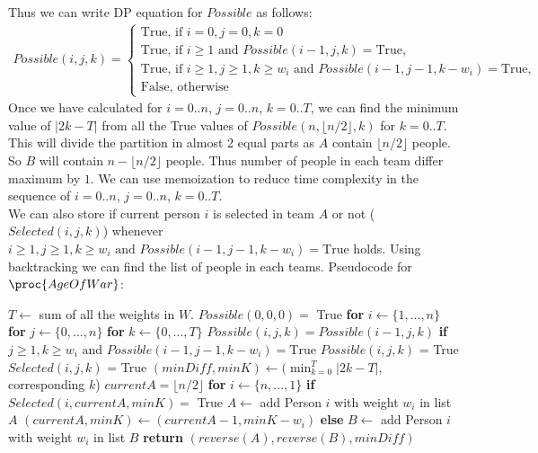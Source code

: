 \documentclass[11pt]{article}
\begin{document}
Thus we can write DP equation for $Possible$ as follows:
\begin{equation}\label{2_1}
    \begin{split}
       Possible(i,j,k) = 
       \begin{cases}
            \text{True, if } i=0,j=0,k=0\\
            \text{True, if } i\geq 1 \text{ and }Possible(i-1,j,k) = \text{True},\\
            \text{True, if } i \geq 1, j\geq1, k\geq w_i \text{ and }Possible(i-1,j-1,k-w_i) = \text{True},\\
            \text{False, otherwise}
        \end{cases}
    \end{split}
\end{equation}
Once we have calculated for $i={0..n}$, $j={0..n}$, $k={0..T}$, we can find the minimum value of $|2k-T|$ from all the True values of $Possible(n,\lfloor n/2 \rfloor,k)$ for $k={0..T}$. This will divide the partition in almost 2 equal parts as $A$ contain $\lfloor n/2 \rfloor$ people. So $B$ will contain $n-\lfloor n/2 \rfloor$ people. Thus number of people in each team differ maximum by $1$. We can use memoization to reduce time complexity in the sequence of $i={0..n}$, $j={0..n}$, $k={0..T}$.\\
We can also store if current person $i$ is selected in team $A$ or not ($Selected(i,j,k)$) whenever $i \geq 1, j\geq1, k\geq w_i \text{ and }Possible(i-1,j-1,k-w_i) = \text{True}$ holds. Using backtracking we can find the list of people in each teams.
\newpage
Pseudocode for $\proc{AgeOfWar}$:
 \begin{codebox}
\li $T \leftarrow$ sum of all the weights in $W$.
\li $Possible(0,0,0)=$ True
\li \textbf{for} $i \leftarrow \{1, ..., n\}$
\li \quad \textbf{for} $j \leftarrow \{0, ..., n\}$
\li \quad \quad \textbf{for} $k \leftarrow \{0, ..., T\}$
\li \quad \quad \quad $Possible(i,j,k) = Possible(i-1,j,k)$
\li \quad \quad \quad \textbf{if} $j\geq1, k\geq w_i \text{ and }Possible(i-1,j-1,k-w_i) = \text{True}$
\li \quad \quad \quad \quad $Possible(i,j,k)$ = True
\li \quad \quad \quad \quad $Selected(i,j,k)$ = True
\li $(minDiff, minK) \leftarrow (\min_{k=0}^{T}{|2k-T|}$, corresponding $k$)
\li $currentA = \lfloor n/2 \rfloor$
\li \textbf{for} $i \leftarrow \{n,...,1\}$
\li \quad \textbf{if} $Selected(i,currentA,minK)=$ True
\li \quad \quad $A \leftarrow$ add Person $i$ with weight $w_i$ in list $A$
\li \quad \quad $(currentA, minK) \leftarrow (currentA-1, minK-w_i)$
\li \quad \textbf{else}
\li \quad \quad $B \leftarrow$ add Person $i$ with weight $w_i$ in list $B$
\li \textbf{return} $(reverse(A), reverse(B), minDiff)$
\end{codebox}
\end{document}
